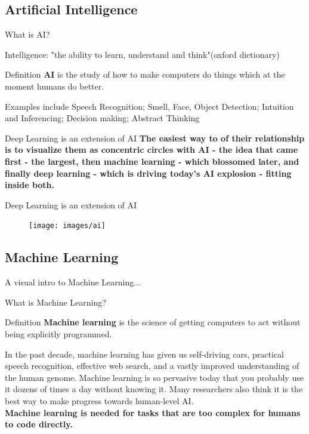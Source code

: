 \documentclass[10pt]{beamer}
\begin{document}
	\subsection{Artificial Intelligence}
	\begin{frame}{What is AI?}
		\begin{center}
			\alert{Intelligence:} "the ability to learn, understand and think"(oxford dictionary)
			\bigskip
			\begin{block}{Definition}
				\textbf{AI} is the study of how to make computers do things which at the moment humans do better.
			\end{block}
			\bigskip
			Examples include Speech Recognition; Smell, Face, Object Detection; Intuition and Inferencing; Decision making; Abstract Thinking
		\end{center} 
	\end{frame}
	\begin{frame}{Deep Learning is an extension of AI}
		\large{\textbf{The easiest way to  of their relationship is to visualize them as concentric circles with AI - the idea that came first - the largest, then machine learning - which blossomed later, and finally deep learning - which is driving today’s AI explosion - fitting inside both.}}
	\end{frame}
	\begin{frame}{Deep Learning is an extension of AI}
		\begin{figure}
			\texttt{[image: images/ai]}
		\end{figure}
	\end{frame}
	
	\subsection{Machine Learning}
	\begin{frame}{A visual intro to Machine Learning...}
	\end{frame}
	\begin{frame}{What is Machine Learning?}
		\begin{center}
			\begin{block}{Definition}
				\textbf{Machine learning} is the science of getting computers to act without being explicitly programmed.
			\end{block}
		\bigskip
			In the past decade, machine learning has given us self-driving cars, practical speech recognition,
			effective web search, and a vastly improved understanding of the human genome. Machine learning is so pervasive today that you
			probably use it dozens of times a day without knowing it. Many
			researchers also think it is the best way to make progress towards
			human-level AI.
			\\
			\textbf{Machine learning is needed for tasks that are too complex for humans to code directly.}
		\end{center} 
	\end{frame}
	
\end{document}
